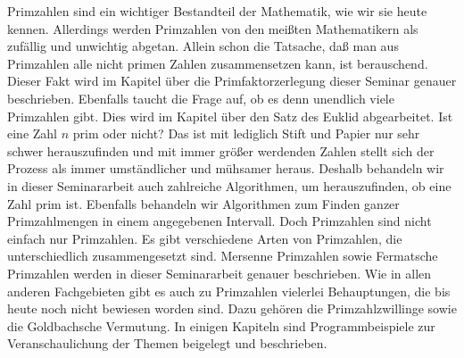 Primzahlen sind ein wichtiger Bestandteil der Mathematik, wie wir sie heute kennen. Allerdings werden Primzahlen von den meißten Mathematikern als zufällig und unwichtig abgetan. Allein schon die Tatsache, daß man aus Primzahlen alle nicht primen Zahlen zusammensetzen kann, ist berauschend. Dieser Fakt wird im Kapitel über die Primfaktorzerlegung dieser Seminar genauer beschrieben. Ebenfalls taucht die Frage auf, ob es denn unendlich viele Primzahlen gibt. Dies wird im Kapitel über den Satz des Euklid abgearbeitet. Ist eine Zahl $n$ prim oder nicht? Das ist mit lediglich Stift und Papier nur sehr schwer herauszufinden und mit immer größer werdenden Zahlen stellt sich der Prozess als immer umständlicher und mühsamer heraus. Deshalb behandeln wir in dieser Seminararbeit auch zahlreiche Algorithmen, um herauszufinden, ob eine Zahl prim ist. Ebenfalls behandeln wir Algorithmen zum Finden ganzer Primzahlmengen in einem angegebenen Intervall. Doch Primzahlen sind nicht einfach nur Primzahlen. Es gibt verschiedene Arten von Primzahlen, die unterschiedlich zusammengesetzt sind. Mersenne Primzahlen sowie Fermatsche Primzahlen werden in dieser Seminararbeit genauer beschrieben. Wie in allen anderen Fachgebieten gibt es auch zu Primzahlen vielerlei Behauptungen, die bis heute noch nicht bewiesen worden sind. Dazu gehören die Primzahlzwillinge sowie die Goldbachsche Vermutung. In einigen Kapiteln sind Programmbeispiele zur Veranschaulichung der Themen beigelegt und beschrieben.
